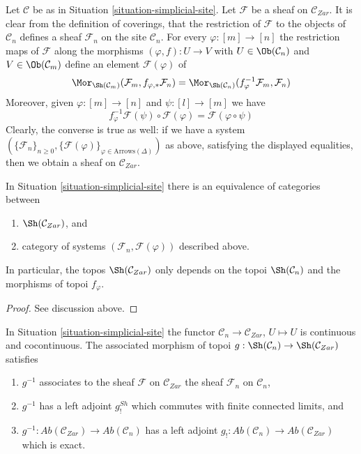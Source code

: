 \noindent
Let $\mathcal{C}$ be as in Situation \ref{situation-simplicial-site}.
Let $\mathcal{F}$ be a sheaf on $\mathcal{C}_{Zar}$.
It is clear from the definition of coverings, that the restriction
of $\mathcal{F}$ to the objects of $\mathcal{C}_n$ defines a sheaf
$\mathcal{F}_n$ on the site $\mathcal{C}_n$. For every
$\varphi : [m] \to [n]$ the restriction maps of $\mathcal{F}$
along the morphisms $(\varphi, f) : U \to V$ with 
$U \in \Ob(\mathcal{C}_n)$ and $V \in \Ob(\mathcal{C}_m)$
define an element $\mathcal{F}(\varphi)$ of
$$
\Mor_{\Sh(\mathcal{C}_m)}(\mathcal{F}_m, f_{\varphi, *}\mathcal{F}_n) =
\Mor_{\Sh(\mathcal{C}_n)}(f_\varphi^{-1}\mathcal{F}_m, \mathcal{F}_n)
$$
Moreover, given $\varphi : [m] \to [n]$ and $\psi : [l] \to [m]$
we have
$$
f_\varphi^{-1}\mathcal{F}(\psi) \circ \mathcal{F}(\varphi) =
\mathcal{F}(\varphi \circ \psi)
$$
Clearly, the converse is true as well: if we have a system
$(\{\mathcal{F}_n\}_{n \geq 0},
\{\mathcal{F}(\varphi)\}_{\varphi \in \text{Arrows}(\Delta)})$
as above, satisfying the displayed equalities,
then we obtain a sheaf on $\mathcal{C}_{Zar}$.

\begin{lemma}
\label{lemma-describe-sheaves-simplicial-site-site}
In Situation \ref{situation-simplicial-site} there is an equivalence of
categories between
\begin{enumerate}
\item $\Sh(\mathcal{C}_{Zar})$, and
\item category of systems $(\mathcal{F}_n, \mathcal{F}(\varphi))$
described above.
\end{enumerate}
In particular, the topos $\Sh(\mathcal{C}_{Zar})$ only depends on
the topoi $\Sh(\mathcal{C}_n)$ and the morphisms of topoi $f_\varphi$.
\end{lemma}

\begin{proof}
See discussion above.
\end{proof}

\begin{lemma}
\label{lemma-restriction-to-components-site}
In Situation \ref{situation-simplicial-site} the functor
$\mathcal{C}_n \to \mathcal{C}_{Zar}$, $U \mapsto U$ is continuous
and cocontinuous. The associated morphism of
topoi $g : \Sh(\mathcal{C}_n) \to \Sh(\mathcal{C}_{Zar})$ satisfies
\begin{enumerate}
\item $g^{-1}$ associates to the sheaf $\mathcal{F}$ on $\mathcal{C}_{Zar}$
the sheaf $\mathcal{F}_n$ on $\mathcal{C}_n$,
\item $g^{-1}$ has a left adjoint $g^{Sh}_!$ which commutes
with finite connected limits, and
\item $g^{-1} : \textit{Ab}(\mathcal{C}_{Zar}) \to \textit{Ab}(\mathcal{C}_n)$
has a left adjoint
$g_! : \textit{Ab}(\mathcal{C}_n) \to \textit{Ab}(\mathcal{C}_{Zar})$
which is exact.
\end{enumerate}
\end{lemma}

